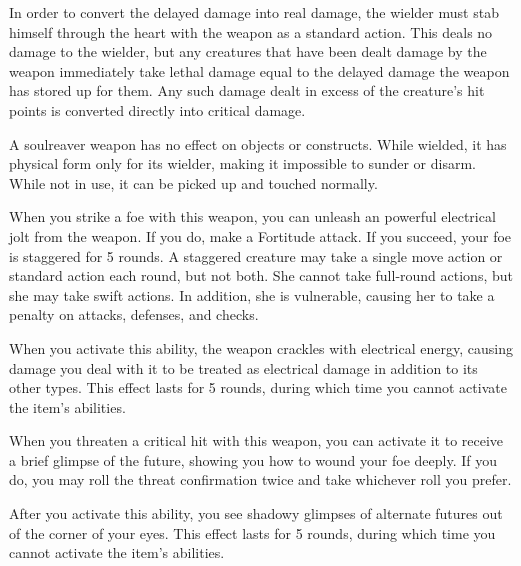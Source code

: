 In order to convert the delayed damage into real damage, the wielder must stab himself through the heart with the weapon as a standard action. This deals no damage to the wielder, but any creatures that have been dealt damage by the weapon immediately take lethal damage equal to the delayed damage the weapon has stored up for them. Any such damage dealt in excess of the creature's hit points is converted directly into critical damage.

A soulreaver weapon has no effect on objects or constructs. While wielded, it has physical form only for its wielder, making it impossible to sunder or disarm. While not in use, it can be picked up and touched normally.


 When you strike a foe with this weapon, you can unleash an powerful electrical jolt from the weapon. If you do, make a Fortitude attack. If you succeed, your foe is staggered for 5 rounds. A staggered creature may take a single move action or standard action each round, but not both. She cannot take full-round actions, but she may take swift actions. In addition, she is vulnerable, causing her to take a  penalty on attacks, defenses, and checks.

When you activate this ability, the weapon crackles with electrical energy, causing damage you deal with it to be treated as electrical damage in addition to its other types. This effect lasts for 5 rounds, during which time you cannot activate the item's abilities.


 When you threaten a critical hit with this weapon, you can activate it to receive a brief glimpse of the future, showing you how to wound your foe deeply. If you do, you may roll the threat confirmation twice and take whichever roll you prefer.

After you activate this ability, you see shadowy glimpses of alternate futures out of the corner of your eyes. This effect lasts for 5 rounds, during which time you cannot activate the item's abilities.


